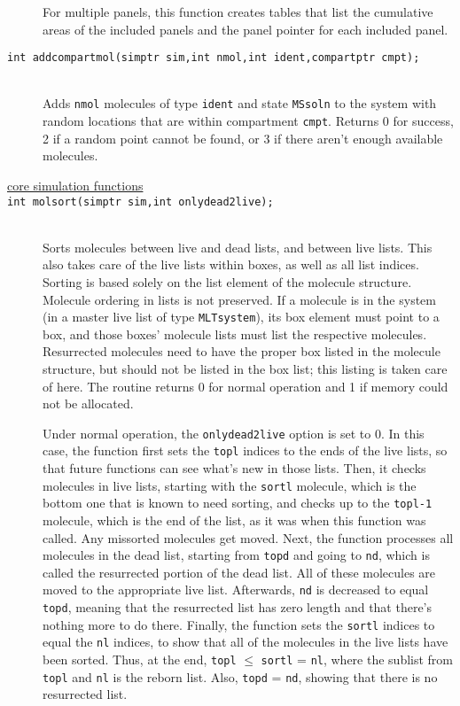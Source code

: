 \documentclass {book}
\newcommand {\ttt} {\texttt}
\begin{document}
\begin{description}
For multiple panels, this function creates tables that list the cumulative areas of the included panels and the panel pointer for each included panel.

\item[\ttt{int addcompartmol(simptr sim,int nmol,int ident,compartptr cmpt);}]
\hfill \\
Adds \ttt{nmol} molecules of type \ttt{ident} and state \ttt{MSsoln} to the system with random locations that are within compartment \ttt{cmpt}. Returns 0 for success, 2 if a random point cannot be found, or 3 if there aren't enough available molecules.

\item[\underline{core simulation functions}]

\item[\ttt{int molsort(simptr sim,int onlydead2live);}]
\hfill \\
Sorts molecules between live and dead lists, and between live lists. This also takes care of the live lists within boxes, as well as all list indices. Sorting is based solely on the list element of the molecule structure. Molecule ordering in lists is not preserved. If a molecule is in the system (in a master live list of type \ttt{MLTsystem}), its box element must point to a box, and those boxes' molecule lists must list the respective molecules. Resurrected molecules need to have the proper box listed in the molecule structure, but should not be listed in the box list; this listing is taken care of here. The routine returns 0 for normal operation and 1 if memory could not be allocated.

Under normal operation, the \ttt{onlydead2live} option is set to 0. In this case, the function first sets the \ttt{topl} indices to the ends of the live lists, so that future functions can see what's new in those lists. Then, it checks molecules in live lists, starting with the \ttt{sortl} molecule, which is the bottom one that is known to need sorting, and checks up to the \ttt{topl-1} molecule, which is the end of the list, as it was when this function was called. Any missorted molecules get moved. Next, the function processes all molecules in the dead list, starting from \ttt{topd} and going to \ttt{nd}, which is called the resurrected portion of the dead list. All of these molecules are moved to the appropriate live list. Afterwards, \ttt{nd} is decreased to equal \ttt{topd}, meaning that the resurrected list has zero length and that there's nothing more to do there. Finally, the function sets the \ttt{sortl} indices to equal the \ttt{nl} indices, to show that all of the molecules in the live lists have been sorted. Thus, at the end, \ttt{topl} $\leq$ \ttt{sortl} = \ttt{nl}, where the sublist from \ttt{topl} and \ttt{nl} is the reborn list. Also, \ttt{topd} = \ttt{nd}, showing that there is no resurrected list.


\end{description}
\end{document}
